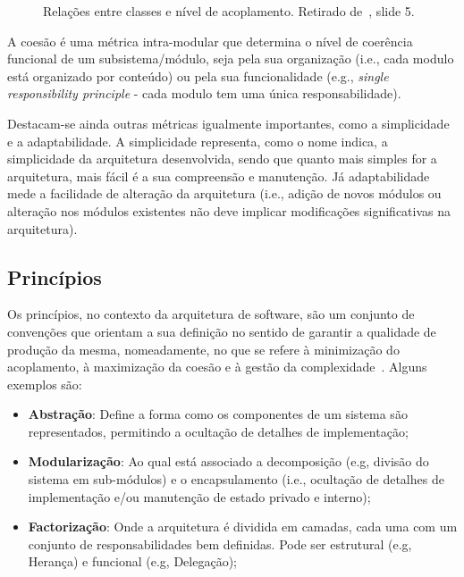 \begin{figure}[H]
    \begin{center}
    \end{center}
    \caption{Relações entre classes e nível de acoplamento.
    Retirado de~\cite{isel:iasa:slides:intro-eng-soft-parte-2}, slide 5.}\label{fig:acoplamento-relacoes}
\end{figure}

A coesão é uma métrica intra-modular que determina o nível de coerência funcional de um subsistema/módulo, seja pela sua organização (i.e., cada modulo está organizado por conteúdo) ou pela sua funcionalidade (e.g., \textit{single responsibility principle} - cada modulo tem uma única responsabilidade).

Destacam-se ainda outras métricas igualmente importantes, como a simplicidade e a adaptabilidade.
A simplicidade representa, como o nome indica, a simplicidade da arquitetura desenvolvida, sendo que quanto mais simples for a arquitetura, mais fácil é a sua compreensão e manutenção.
Já adaptabilidade mede a facilidade de alteração da arquitetura (i.e., adição de novos módulos ou alteração nos módulos existentes não deve implicar modificações significativas na arquitetura).

\subsection{Princípios}\label{subsec:principios}

Os princípios, no contexto da arquitetura de software, são um conjunto de convenções que orientam a sua definição no sentido de garantir a qualidade de produção da mesma, nomeadamente, no que se refere à minimização do acoplamento, à maximização da coesão e à gestão da complexidade~\cite{isel:iasa:slides:intro-eng-soft-parte-2}.
Alguns exemplos são:
\begin{itemize}
    \item \textbf{Abstração}: Define a forma como os componentes de um sistema são representados, permitindo a ocultação de detalhes de implementação;
    \item \textbf{Modularização}: Ao qual está associado a decomposição (e.g, divisão do sistema em sub-módulos) e o encapsulamento (i.e., ocultação de detalhes de implementação e/ou manutenção de estado privado e interno);
    \item \textbf{Factorização}: Onde a arquitetura é dividida em camadas, cada uma com um conjunto de responsabilidades bem definidas.
    Pode ser estrutural (e.g, Herança) e funcional (e.g, Delegação);
\end{itemize}


